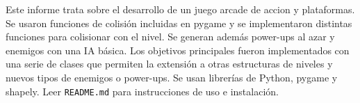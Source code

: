 %
%


Este informe trata sobre el desarrollo de un juego arcade de accion y plataformas. Se usaron funciones de colisión incluidas en pygame y se implementaron distintas funciones para colisionar con el nivel. Se generan además power-ups al azar y enemigos con una IA básica. Los objetivos principales fueron implementados con una serie de clases que permiten la extensión a otras estructuras de niveles y nuevos tipos de enemigos o power-ups. Se usan librerías de Python, pygame y shapely. Leer \verb!README.md! para instrucciones de uso e instalación.